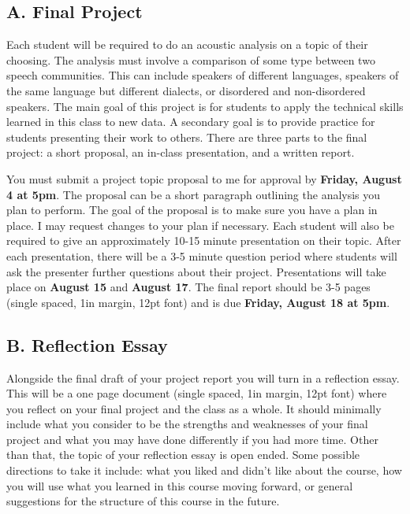 \documentclass[11pt]{article}
\begin{document}
\subsection*{A. Final Project}

Each student will be required to do an acoustic analysis on a topic of their choosing. 
The analysis must involve a comparison of some type between two speech communities. 
This can include speakers of different languages, speakers of the same language but different dialects, or disordered and non-disordered speakers.
The main goal of this project is for students to apply the technical skills learned in this class to new data.
A secondary goal is to provide practice for students presenting their work to others.
There are three parts to the final project: a short proposal, an in-class presentation, and a written report.

You must submit a project topic proposal to me for approval by \textbf{Friday, August 4 at 5pm}. 
The proposal can be a short paragraph outlining the analysis you plan to perform. The goal of the proposal is to make sure you have a plan in place. 
I may request changes to your plan if necessary. 
Each student will also be required to give an approximately 10-15 minute presentation on their topic. 
After each presentation, there will be a 3-5 minute question period where students will ask the presenter further questions about their project. 
Presentations will take place on \textbf{August 15} and \textbf{August 17}. 
The final report should be 3-5 pages (single spaced, 1in margin, 12pt font) and is due \textbf{Friday, August 18 at 5pm}.

\subsection*{B. Reflection Essay}

Alongside the final draft of your project report you will turn in a reflection essay. This will be a one page document (single spaced, 1in margin, 12pt font) where you reflect on your final project and the class as a whole. It should minimally include what you consider to be the strengths and weaknesses of your final project and what you may have done differently if you had more time. Other than that, the topic of your reflection essay is open ended. Some possible directions to take it include: what you liked and didn't like about the course, how you will use what you learned in this course moving forward, or general suggestions for the structure of this course in the future.
\end{document}
